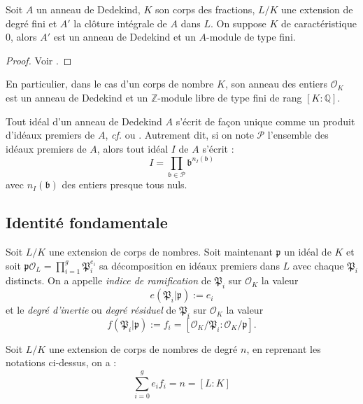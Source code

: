 \documentclass[a4paper]{article} %
\numberwithin{section}{part}
\numberwithin{equation}{section}
\newcommand\QQ{\mathbb{Q}}
\newcommand\ZZ{\mathbb{Z}}
\newcommand\EO{\mathcal{O}}
\begin{document}
\begin{thm}
Soit $A$ un anneau de Dedekind, $K$ son corps des fractions, $L/K$ une extension
de degré fini et $A'$ la clôture intégrale de $A$ dans $L$. On suppose $K$ de
caractéristique $0$, alors $A'$ est un anneau de Dedekind et un $A$-module de
type fini.
\end{thm}
\begin{proof}
Voir \cite[p.~59, th. 1]{Sam}.
\end{proof}
\begin{rem}
En particulier, dans le cas d'un corps de nombre $K$, son anneau des entiers
$\EO_K$ est un anneau de Dedekind et un $\ZZ$-module libre de type fini de rang
$[K:\QQ]$.
\end{rem}
Tout idéal d'un anneau de Dedekind $A$ s'écrit de façon unique comme un produit 
d'idéaux premiers de $A$, \emph{cf.} \cite[p.~60, th. 3]{Sam} ou 
\cite[§I.6, th. 2]{Lan2}. Autrement dit, si on note $\mathcal{P}$ l'ensemble des
idéaux premiers de $A$, alors tout idéal $I$ de $A$ s'écrit :
\begin{equation}
I = \prod_{\mathfrak{b}\in \mathcal{P}}{\mathfrak{b}^{n_I(\mathfrak{b})}}
\end{equation}
avec $n_I(\mathfrak{b})$ des entiers presque tous nuls.


\subsection{Identité fondamentale}
\begin{defn}
Soit $L/K$ une extension de corps de nombres. Soit maintenant $\mathfrak{p}$ un 
idéal de $K$ et soit $\mathfrak{p}\EO_L = \prod_{i=1}^{g}{\mathfrak{P}_i^{e_i}}$
sa décomposition en idéaux premiers dans $L$ avec chaque $\mathfrak{P}_i$
distincts. On a appelle \emph{indice de ramification} de $\mathfrak{P}_i$ sur 
$\EO_K$ la valeur 
\begin{equation}
e(\mathfrak{P}_i\vert \mathfrak{p}) := e_i
\end{equation}
et le \emph{degré d'inertie} ou \emph{degré résiduel} de $\mathfrak{P}_i$ sur
$\EO_K$ la valeur
\begin{equation}
f(\mathfrak{P}_i\vert \mathfrak{p}) := f_i =
[\EO_K/\mathfrak{P}_i:\EO_K/\mathfrak{p}].
\end{equation}
\end{defn}

\begin{thm}
\label{th:fundid}
Soit $L/K$ une extension de corps de nombres de degré $n$, en reprenant les 
notations ci-dessus, on a :
\begin{equation}
\sum_{i=0}^g{e_if_i} = n = [L:K]
\end{equation}
\end{thm}
\end{document}
